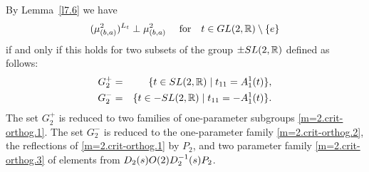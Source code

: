 \documentclass[preprint,12pt]{elsarticle}
\numberwithin{equation}{section}
\begin{document}
\begin{rem}
\label{r.pm-SL(2)}
By Lemma~\ref{l7.6} we have
%
\begin{equation*}
 (\mu_{(b,a)}^2)^{L_t}\perp\mu_{(b,a)}^2\quad
\text{ for}\quad t\in {\rm GL}(2,{\mathbb R})\setminus\{e\}
\end{equation*}
if and only if this holds  for two subsets  
of the group 
$\pm{\rm SL}(2,\mathbb R)$
defined as follows:
\begin{eqnarray}
\label{G^+_2.d} 
G^+_2 
&=&\{t\in {\rm SL}(2,{\mathbb R})\mid t_{11}=A^1_1(t)\},\\
\label{G^-_2.d}
G^-_2
&=&\{t\in -{\rm SL}(2,{\mathbb R})\mid t_{11}=-A^1_1(t)\}.
\end{eqnarray}
%
The set $G^+_2$
is reduced to  two  families of one-parameter subgroups \eqref{m=2.crit-orthog.1}.
The set  $G^-_2$
is reduced to  the one-parameter family \eqref{m=2.crit-orthog.2}, the reflections of 
\eqref{m=2.crit-orthog.1} by $P_2$, and two parameter family \eqref{m=2.crit-orthog.3} of elements 
from $D_2(s){\rm O}(2)D^{-1}_2(s)P_2$.
\end{rem}
\end{document}
